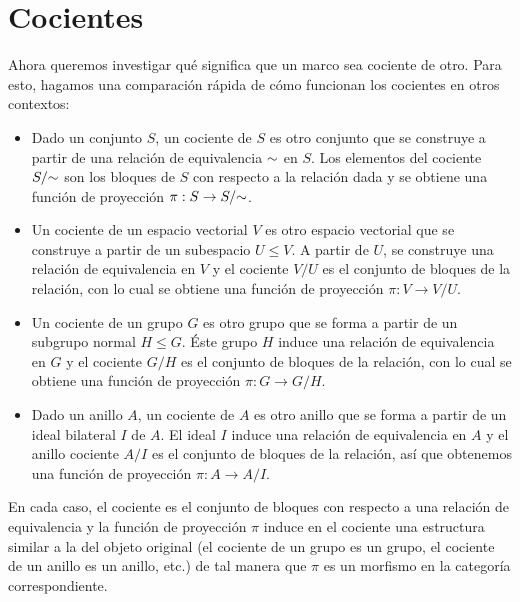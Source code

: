 \chapter{Cocientes}
\label{ch:cocientes}

Ahora queremos investigar qué significa que un marco sea cociente
de otro.
Para esto, hagamos una comparación rápida de cómo funcionan los
cocientes en otros contextos:

\begin{itemize}
  \item
  Dado un conjunto $S$, un cociente de $S$ es otro conjunto
  que se construye a partir de una relación de equivalencia
  ${\sim}$ en $S$.
  Los elementos del cociente $S/{\sim}$ son los bloques de $S$ con
  respecto a la relación dada y se obtiene una función de
  proyección $\pi:S\to S/{\sim}$.

  \item
  Un cociente de un espacio vectorial $V$ es otro espacio
  vectorial que se construye a partir de un subespacio
  $U\leq V$.
  A partir de $U$, se construye una relación de equivalencia en
  $V$ y el cociente $V/U$ es el conjunto de bloques de la
  relación, con lo cual se obtiene una función de
  proyección $\pi:V\to V/U$.

  \item
  Un cociente de un grupo $G$ es otro grupo
  que se forma a partir de un subgrupo normal $H\leq G$.
  Éste grupo $H$ induce una relación de equivalencia en $G$ y el
  cociente $G/H$ es el conjunto de bloques de la
  relación, con lo cual se obtiene una función de proyección
  $\pi:G\to G/H$.

  \item
  Dado un anillo $A$, un cociente de $A$ es otro anillo que se
  forma a partir de un ideal bilateral $I$ de $A$.
  El ideal $I$ induce una relación de equivalencia en $A$ y el
  anillo cociente $A/I$ es el conjunto de bloques de la relación,
  así que obtenemos una función de proyección $\pi:A\to A/I$.
\end{itemize}
En cada caso, el cociente es el conjunto
de bloques con respecto a una relación de equivalencia y la
función de proyección $\pi$ induce en el cociente
una estructura similar a la del objeto original (el
cociente de un grupo es un grupo, el cociente de un anillo es un
anillo, etc.) de tal manera que $\pi$ es
un morfismo en la categoría correspondiente.

